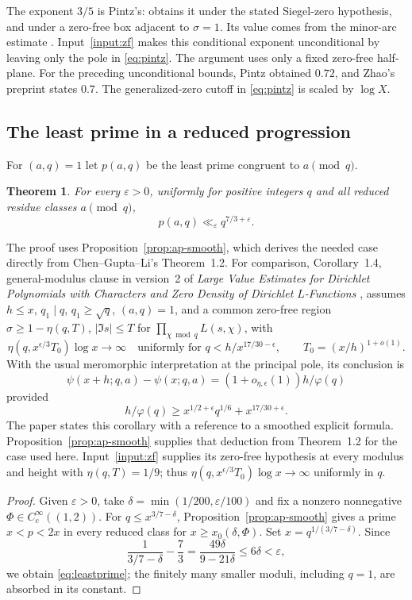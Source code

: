 \documentclass[11pt]{article}
\newtheorem{theorem}{Theorem}[section]
\theoremstyle{definition}
\newcommand{\ph}{\varphi}
\begin{document}
The exponent $3/5$ is Pintz's: \cite[Theorem~2, (2.13)--(2.14)]{PintzI}
obtains it under the stated Siegel-zero hypothesis, and
\cite[Theorem~3, (2.16)]{PintzI} under a zero-free box adjacent to
$\sigma=1$. Its value comes from the minor-arc estimate
\cite[\S5]{PintzI}. Input~\ref{input:zf} makes this conditional exponent
unconditional by leaving only the pole in \eqref{eq:pintz}.
The argument uses only a fixed zero-free half-plane.
For the preceding unconditional bounds, Pintz
\cite[Theorem~1]{PintzII} obtained $0.72$, and Zhao's preprint
\cite[Theorem~1.1, version~2]{Zhao2026} states $0.7$.
The generalized-zero cutoff in \eqref{eq:pintz} is scaled by $\log X$.

\subsection{The least prime in a reduced progression}
For $(a,q)=1$ let $p(a,q)$ be the least prime congruent to $a\pmod q$.

\begin{theorem}\label{thm:leastprime}
For every $\varepsilon>0$, uniformly for positive integers $q$ and all
reduced residue classes $a\pmod q$,
\begin{equation}\label{eq:leastprime}
 p(a,q)\ll_\varepsilon q^{7/3+\varepsilon}.
\end{equation}
\end{theorem}

The proof uses Proposition~\ref{prop:ap-smooth}, which derives the needed
case directly from Chen--Gupta--Li's Theorem~1.2.
For comparison, Corollary~1.4, general-modulus clause in version~2 of
\emph{Large Value Estimates for Dirichlet Polynomials with Characters
and Zero Density of Dirichlet $L$-Functions} \cite{CGL}, assumes
$h\le x$, $q_1\mid q$, $q_1\ge\sqrt q$, $(a,q)=1$, and a common zero-free
region $\sigma\ge1-\eta(q,T)$, $|\Im s|\le T$ for
$\prod_{\chi\bmod q}L(s,\chi)$, with
\[
 \eta(q,x^{\epsilon/3}T_0)\log x\longrightarrow\infty
 \quad\text{uniformly for }q<h/x^{17/30-\epsilon},\qquad
 T_0=(x/h)^{1+o(1)}.
\]
With the usual meromorphic interpretation at the principal pole, its
conclusion is
\[
 \psi(x+h;q,a)-\psi(x;q,a)=(1+o_{\eta,\epsilon}(1))h/\ph(q)
\]
provided
\[
 h/\ph(q)\ge x^{1/2+\epsilon}q^{1/6}+x^{17/30+\epsilon}.
\]
The paper states this corollary with a reference to a smoothed explicit
formula. Proposition~\ref{prop:ap-smooth} supplies that deduction from
Theorem~1.2 for the case used here.
Input~\ref{input:zf} supplies its zero-free hypothesis at every modulus
and height with $\eta(q,T)=1/9$; thus
$\eta(q,x^{\epsilon/3}T_0)\log x\to\infty$ uniformly in $q$.
\begin{proof}
Given $\varepsilon>0$, take $\delta=\min(1/200,\varepsilon/100)$
and fix a nonzero nonnegative $\Phi\in C_c^\infty((1,2))$.
For $q\le x^{3/7-\delta}$, Proposition~\ref{prop:ap-smooth} gives
a prime $x<p<2x$ in every reduced class for $x\ge x_0(\delta,\Phi)$.
Set $x=q^{1/(3/7-\delta)}$. Since
\[
 \frac1{3/7-\delta}-\frac73
 =\frac{49\delta}{9-21\delta}\le6\delta<\varepsilon,
\]
we obtain \eqref{eq:leastprime}; the finitely many smaller moduli,
including $q=1$, are absorbed in its constant.
\end{proof}
\end{document}
